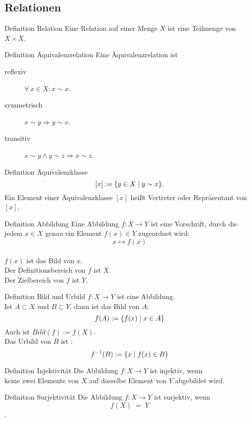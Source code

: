 \documentclass[a6paper,11pt,print,grid=front]{kartei}
\begin{document}
\subsection*{Relationen}
\begin{karte}{Definition Relation}
    Eine Relation auf einer Menge \(X\)  ist eine Teilmenge 
    von \( X \times X \).
\end{karte}
\begin{karte}{Definition Äquivalenzrelation}
    Eine Äquivalenzrelation ist 
    \begin{description}
        \item[reflexiv] \( \forall \, x \in X : x \sim x \).
        \item[symmetrisch] \( x \sim y \Rightarrow y \sim x \).
        \item[transitiv] \( x \sim y \wedge y \sim z \Rightarrow 
        x \sim z \).
    \end{description}
\end{karte}
\begin{karte}{Definition Äquivalenzklasse}
    \[ [ x ] := \{ y \in X \;\vert \; y \sim x \}. \]
    Ein Element einer Äquivalenzklasse \( [x] \) heißt 
    Vertreter oder Repräsentant von \( [x] \).
\end{karte}
\begin{karte}{Definition Abbildung}
    Eine Abbildung \(f : X \rightarrow Y\) ist eine Vorschrift, 
    durch die jedem \(x \in X \) genau ein Element \(f(x) \in Y\)
    zugeordnet wird:  \\
    \[ x \mapsto f(x)\] \\
     \( f(x)\) ist das Bild von \(x\). \\
    Der Definitionsbereich von \(f\) ist \(X\). \\
    Der Zielbereich von \(f\) ist \(Y\). 
\end{karte}
\begin{karte}{Definition Bild und Urbild}
    \(f : X \rightarrow Y\) ist eine Abbildung. \\
    Ist \(A \subset X\) und \(B \subset Y\),
     dann ist das Bild von \(A\):
    \[f(A) := \{ f(x) \;\vert \; x \in A \}\]
    Auch ist \(Bild(f) := f(X)\). \\
    Das Urbild von \(B\) ist : 
    \[f^{-1}(B) := \{x \;\vert \; f(x) \in B\}\]
\end{karte}
\begin{karte}{Definition Injektivität}
Die Abbildung \(f: X \rightarrow Y\) ist injektiv, wenn \\
keine zwei Elemente von \(X\) auf dasselbe Element von \(Y\) abgebildet wird. 
\end{karte}
\begin{karte}{Definition Surjektivität}
    Die Abbildung \(f: X \rightarrow Y\) ist surjektiv, wenn \\
    \[ f(X) \; = \; Y\].
\end{karte} 
\end{document}
